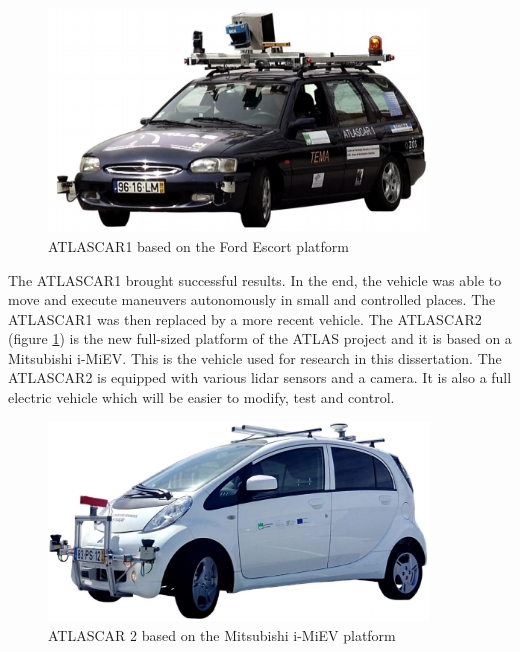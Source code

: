 \begin{figure}[htp]
	
	\centering
	\includegraphics[width=0.9\textwidth]{capintro/imgs/atlascar1}
	
	\caption{ATLASCAR1 based on the Ford Escort platform}
	\label{fig:atlascar1}
	
\end{figure}

The ATLASCAR1 brought successful results. In the end, the vehicle was able to move and execute maneuvers autonomously in small and controlled places. The ATLASCAR1 was then replaced by a more recent vehicle. The ATLASCAR2 (figure \ref{fig:atlascar1}) is the new full-sized platform of the ATLAS project and it is based on a Mitsubishi i-MiEV. This is the vehicle used for research in this dissertation. The ATLASCAR2 is equipped with various \gls{lidar} sensors and a camera. It is also a full electric vehicle which will be easier to modify, test and control. 

\begin{figure}[htp]
	
	\centering
	\includegraphics[width=0.9\textwidth]{capintro/imgs/atlas2.png}
	
	\caption{ATLASCAR 2 based on the Mitsubishi i-MiEV platform}
	\label{fig:atlascar2}
	
\end{figure}


